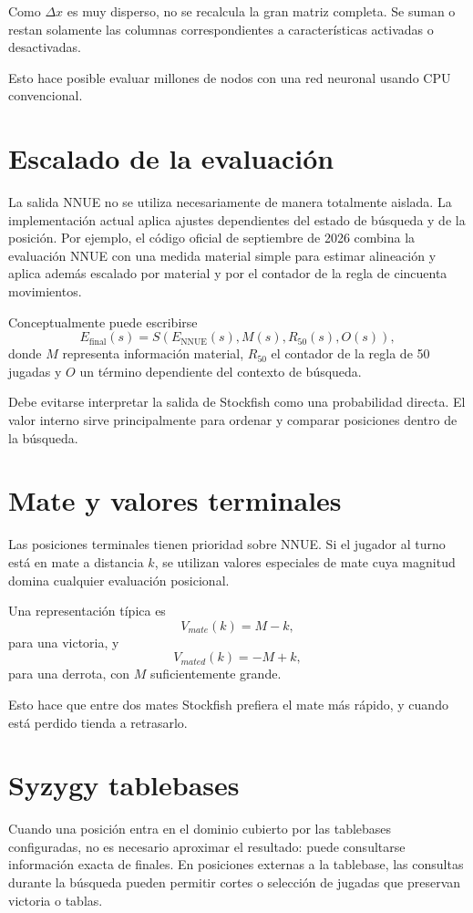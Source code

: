 \documentclass[11pt,a4paper]{article}
\begin{document}
Como $\Delta x$ es muy disperso, no se recalcula la gran matriz completa. Se suman o restan solamente las columnas correspondientes a características activadas o desactivadas.

Esto hace posible evaluar millones de nodos con una red neuronal usando CPU convencional.

\section{Escalado de la evaluación}

La salida NNUE no se utiliza necesariamente de manera totalmente aislada. La implementación actual aplica ajustes dependientes del estado de búsqueda y de la posición. Por ejemplo, el código oficial de septiembre de 2026 combina la evaluación NNUE con una medida material simple para estimar alineación y aplica además escalado por material y por el contador de la regla de cincuenta movimientos.

Conceptualmente puede escribirse
\[
E_{\mathrm{final}}(s)
= S\left(E_{\mathrm{NNUE}}(s),M(s),R_{50}(s),O(s)\right),
\]
donde $M$ representa información material, $R_{50}$ el contador de la regla de 50 jugadas y $O$ un término dependiente del contexto de búsqueda.

Debe evitarse interpretar la salida de Stockfish como una probabilidad directa. El valor interno sirve principalmente para ordenar y comparar posiciones dentro de la búsqueda.

\section{Mate y valores terminales}

Las posiciones terminales tienen prioridad sobre NNUE. Si el jugador al turno está en mate a distancia $k$, se utilizan valores especiales de mate cuya magnitud domina cualquier evaluación posicional.

Una representación típica es
\[
V_{mate}(k)=M-k,
\]
para una victoria, y
\[
V_{mated}(k)=-M+k,
\]
para una derrota, con $M$ suficientemente grande.

Esto hace que entre dos mates Stockfish prefiera el mate más rápido, y cuando está perdido tienda a retrasarlo.

\section{Syzygy tablebases}

Cuando una posición entra en el dominio cubierto por las tablebases configuradas, no es necesario aproximar el resultado: puede consultarse información exacta de finales. En posiciones externas a la tablebase, las consultas durante la búsqueda pueden permitir cortes o selección de jugadas que preservan victoria o tablas.
\end{document}
